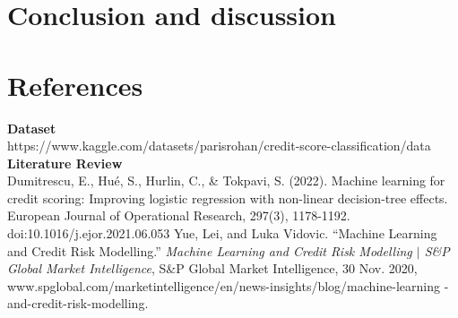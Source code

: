 \documentclass{article}
\begin{document}
\section*{Conclusion and discussion}

\newpage
\section*{References}
\textbf{Dataset}\\
https://www.kaggle.com/datasets/parisrohan/credit-score-classification/data
\vspace{5mm}\newline
\textbf{Literature Review}\\
Dumitrescu, E., Hué, S., Hurlin, C., \& Tokpavi, S. (2022). 
Machine learning for credit scoring: Improving logistic regression 
with non-linear decision-tree effects. European Journal of Operational 
Research, 297(3), 1178-1192. doi:10.1016/j.ejor.2021.06.053
\vspace{5mm}\newline
Yue, Lei, and Luka Vidovic. “Machine Learning and Credit Risk Modelling.”
 \textit{Machine Learning and Credit Risk Modelling $\vert$ S\&P Global Market Intelligence}, 
 S\&P Global Market Intelligence, 30 Nov. 2020, 
 www.spglobal.com/marketintelligence/en/news-insights/blog/machine-learning
 -and-credit-risk-modelling. 
\end{document}
